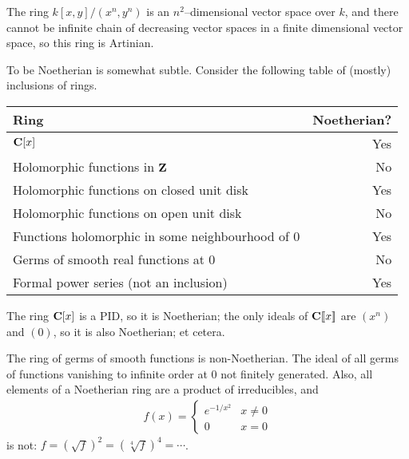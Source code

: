 \documentclass[11pt, oneside,margin=1in]{article}
\begin{document}
\begin{example}\label{}
The ring $k[x,y]/(x^n,y^n)$ is an $n^2$--dimensional vector space over $k$, and there cannot be infinite chain of decreasing vector spaces in a finite dimensional vector space, so this ring is Artinian.
\end{example}

To be Noetherian is somewhat subtle. Consider the following table of (mostly) inclusions of rings.
	\begin{center}
\begin{tabular}{lr}
    	Ring & Noetherian?\\
	\midrule
	$\mathbf C[x]$ & Yes\\
	Holomorphic functions in $\mathbf Z$ & No\\
	Holomorphic functions on closed unit disk & Yes\\
	Holomorphic functions on open unit disk & No\\
	Functions holomorphic in some neighbourhood of $0$ & Yes\\
	Germs of smooth real functions at $0$ & No\\
	Formal power series (not an inclusion) & Yes
\end{tabular}
\end{center}

The ring $\mathbf C[x]$ is a PID, so it is Noetherian; the only ideals of $\mathbf C[\![x]\!]$ are $(x^n)$ and $(0)$, so it is also Noetherian; et cetera.
\iffalse The ring of holomorphic functions on $\C$ is not Noetherian: consider the ideal of functions vanishing on all but a finite number of naturals. The ring of functions holomorphic on the closed disk is a PID: any function has a finite number of roots on the closed disk, and all ideals are principal generated by polynomials. The ring of functions holomorphic on the open unit disk is not Noetherian by the same argument above: determine a sequence of numbers on the open unit disk with no limit point in the disk. 
\fi
The ring of germs of smooth functions is non-Noetherian. The ideal of all germs of functions vanishing to infinite order at $0$ not finitely generated. Also, all elements of a Noetherian ring are a product of irreducibles, and
\begin{align*} f(x) =
	\begin{cases}
		e^{-1/x^2} & x\ne 0\\
		0 & x=0
	\end{cases}
\end{align*}
is not: $f = \left( \sqrt{f} \right)^2  = \left( \sqrt[4]{f} \right)^4  = \cdots  $.
\end{document}
